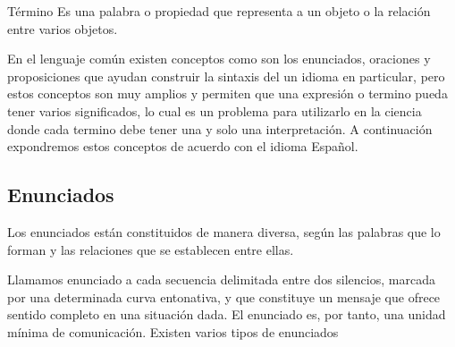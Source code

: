 \begin{ideas}{} Término Es una palabra o propiedad que representa
a un objeto o la relación entre varios objetos. \end{ideas}

En el lenguaje común existen conceptos como son los \textsf{enunciados,
oraciones y proposiciones} que ayudan construir la sintaxis del un
idioma en particular, pero estos conceptos son muy amplios y permiten
que una expresión o termino pueda tener varios significados, lo cual
es un problema para utilizarlo en la ciencia donde cada termino debe
tener una y solo una interpretación. A continuación expondremos estos
conceptos de acuerdo con el idioma Español.


\subsection{Enunciados}

Los enunciados están constituidos de manera diversa, según las palabras
que lo forman y las relaciones que se establecen entre ellas.

Llamamos enunciado a cada secuencia delimitada entre dos silencios,
marcada por una determinada curva entonativa, y que constituye un
mensaje que ofrece sentido completo en una situación dada. El enunciado
es, por tanto, una unidad mínima de comunicación. Existen varios tipos
de enunciados

